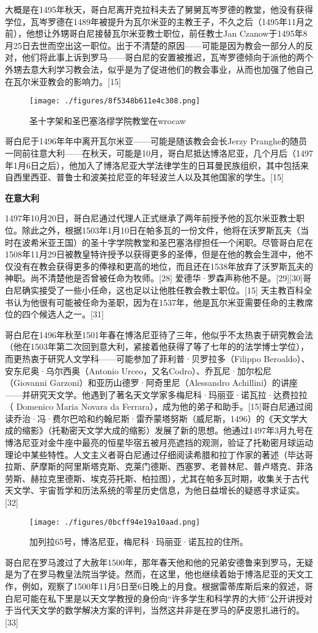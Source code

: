 大概是在1495年秋天，哥白尼离开克拉科夫去了舅舅瓦岑罗德的教堂，他没有获得学位，瓦岑罗德在1489年被提升为瓦尔米亚的主教王子，不久之后（1495年11月之前），他想让外甥哥白尼接替瓦尔米亚教士职位，前任教士Jan Czanow于1495年8月25日去世而空出这一职位。出于不清楚的原因——可能是因为教会一部分人的反对，他们将此事上诉到罗马——哥白尼的安置被推迟，瓦岑罗德倾向于派他的两个外甥去意大利学习教会法，似乎是为了促进他们的教会事业，从而也加强了他自己在瓦尔米亚教会的影响力。[15]
\begin{figure}[ht]
\centering
\texttt{[image: ./figures/8f5348b611e4c308.png]}
\caption{圣十字架和圣巴塞洛缪学院教堂在wrocaw} \label{fig_GBN_5}
\end{figure}
哥白尼于1496年年中离开瓦尔米亚——可能是随该教会会长Jerzy Pranghe的随员一同前往意大利——在秋天，可能是10月，哥白尼抵达博洛尼亚，几个月后（1497年1月6日之后），他加入了博洛尼亚大学法律学生的日耳曼民族组织，其中包括来自西里西亚、普鲁士和波美拉尼亚的年轻波兰人以及其他国家的学生。[15]

\textbf{在意大利}

1497年10月20日，哥白尼通过代理人正式继承了两年前授予他的瓦尔米亚教士职位。除此之外，根据1503年1月10日在帕多瓦的一份文件，他将在沃罗斯瓦夫（当时在波希米亚王国）的圣十字学院教堂和圣巴塞洛缪担任一个闲职。尽管哥白尼在1508年11月29日被教皇特许授予以获得更多的圣俸，但是在他的教会生涯中，他不仅没有在教会获得更多的俸禄和更高的地位，而且还在1538年放弃了沃罗斯瓦夫的神职。尚不清楚他是否曾被任命为牧师。[28] 爱德华·罗森声称他不是。[29][30]哥白尼确实接受了一些小任命，这也足以让他胜任教会教士职位。[15] 天主教百科全书认为他很有可能被任命为圣职，因为在1537年，他是瓦尔米亚需要任命的主教席位的四个候选人之一。[31]

哥白尼在1496年秋至1501年春在博洛尼亚待了三年，他似乎不太热衷于研究教会法（他在1503年第二次回到意大利，紧接着他获得了等了七年的的法学博士学位），而更热衷于研究人文学科——可能参加了菲利普·贝罗拉多（Filippo Beroaldo）、安东尼奥·乌尔西奥（Antonio Urceo，又名Codro）、乔瓦尼·加尔松尼（Giovanni Garzoni）和亚历山德罗·阿奇里尼（Alessandro Achillini）的讲座——并研究天文学。他遇到了著名天文学家多梅尼科·玛丽亚·诺瓦拉·达费拉拉（ Domenico Maria Novara da Ferrara），成为他的弟子和助手。[15]哥白尼通过阅读乔治·冯·费尔巴哈和约翰尼斯·雷乔蒙塔努斯（威尼斯，1496）的《天文学大成的缩影》（托勒密天文学大成的缩影）发展了新的思想。他通过1497年3月九号在博洛尼亚对金牛座中最亮的恒星毕宿五被月亮遮挡的观测，验证了托勒密月球运动理论中某些特性。人文主义者哥白尼通过仔细阅读希腊和拉丁作家的著述（毕达哥拉斯、萨摩斯的阿里斯塔克斯、克莱门德斯、西塞罗、老普林尼、普卢塔克、菲洛劳斯、赫拉克里德斯、埃克芬托斯、柏拉图），尤其在帕多瓦时期，收集关于古代天文学、宇宙哲学和历法系统的零星历史信息，为他日益增长的疑惑寻求证实。[32]
\begin{figure}[ht]
\centering
\texttt{[image: ./figures/0bcff94e19a10aad.png]}
\caption{加列拉65号，博洛尼亚，梅尼科·玛丽亚·诺瓦拉的住所。} \label{fig_GBN_6}
\end{figure}
哥白尼在罗马渡过了大赦年1500年，那年春天他和他的兄弟安德鲁来到罗马，无疑是为了在罗马教皇法院当学徒。然而，在这里，他也继续着始于博洛尼亚的天文工作，例如，观察了1500年11月5日至6日晚上的月食。根据雷蒂库斯后来的叙述，哥白尼可能在私下里是以天文学教授的身份向“许多学生和科学界的大师”公开讲授对于当代天文学的数学解决方案的评判，当然这并非是在罗马的萨皮恩扎进行的。[33]

